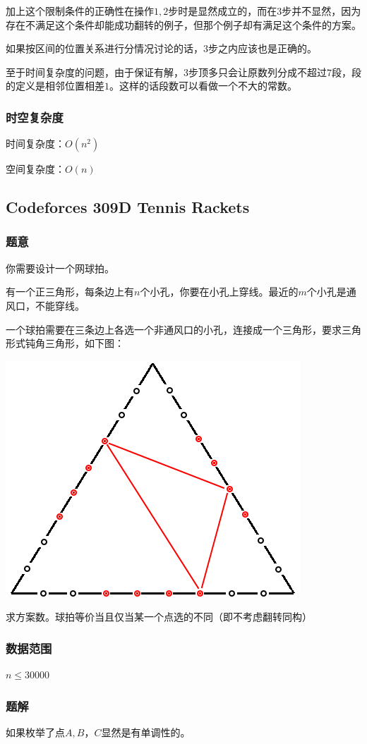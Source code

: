 \documentclass{ctexart}
\begin{document}
加上这个限制条件的正确性在操作$1,2$步时是显然成立的，而在$3$步并不显然，因为存在不满足这个条件却能成功翻转的例子，但那个例子却有满足这个条件的方案。

如果按区间的位置关系进行分情况讨论的话，$3$步之内应该也是正确的。

至于时间复杂度的问题，由于保证有解，$3$步顶多只会让原数列分成不超过$7$段，段的定义是相邻位置相差$1$。这样的话段数可以看做一个不大的常数。
\subsubsection{时空复杂度}
时间复杂度：$O(n^2)$

空间复杂度：$O(n)$
\subsection{Codeforces 309D Tennis Rackets}
\subsubsection{题意}
你需要设计一个网球拍。

有一个正三角形，每条边上有$n$个小孔，你要在小孔上穿线。最近的$m$个小孔是通风口，不能穿线。

一个球拍需要在三条边上各选一个非通风口的小孔，连接成一个三角形，要求三角形式钝角三角形，如下图：

\includegraphics{tennis.png}

求方案数。球拍等价当且仅当某一个点选的不同（即不考虑翻转同构）
\subsubsection{数据范围}
$n \le 30000$
\subsubsection{题解}
如果枚举了点$A,B$，$C$显然是有单调性的。
\end{document}
